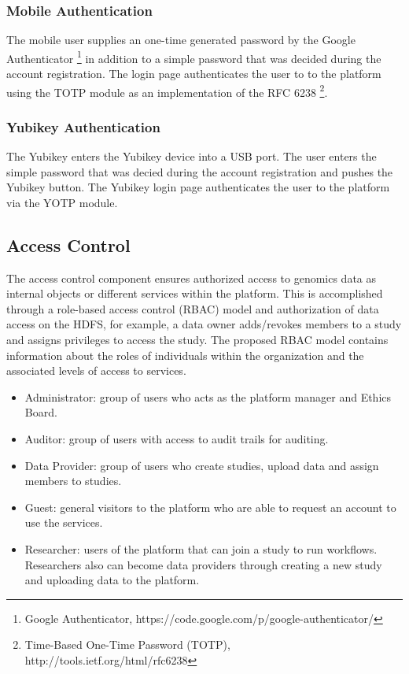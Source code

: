 \subsubsection {Mobile Authentication}
The mobile user supplies an one-time generated password by the Google Authenticator \footnote{Google Authenticator, https://code.google.com/p/google-authenticator/} in addition to a simple password that was decided during the account registration. The login page authenticates the user to to the platform using the TOTP module as an implementation of the RFC 6238 \footnote{Time-Based One-Time Password (TOTP), http://tools.ietf.org/html/rfc6238}.   

\subsubsection {Yubikey Authentication}
The Yubikey enters the Yubikey device into a USB port. The user enters the simple password that was decied during the account registration and pushes the Yubikey button. The Yubikey login page authenticates the user to the platform via the YOTP module.

\subsection {Access Control}
The access control component ensures authorized access to genomics data as internal objects or different services within the platform. This is accomplished through a role-based access control (RBAC) model and authorization of data access on the HDFS, for example, a data owner adds/revokes members to a study and assigns privileges to access the study.
% 
The proposed RBAC model contains information about the roles of individuals within the organization and the associated levels of access to services.
\begin{itemize}
\item Administrator: group of users who acts as the platform manager and Ethics Board.
\item Auditor: group of users with access to audit trails for auditing.
\item Data Provider: group of users who create studies, upload data and assign members to studies.
\item Guest: general visitors to the platform who are able to request an account to use the services.
\item Researcher: users of the platform that can join a study to run workflows. Researchers also can become data providers through creating a new study and uploading data to the platform.
\end{itemize}

